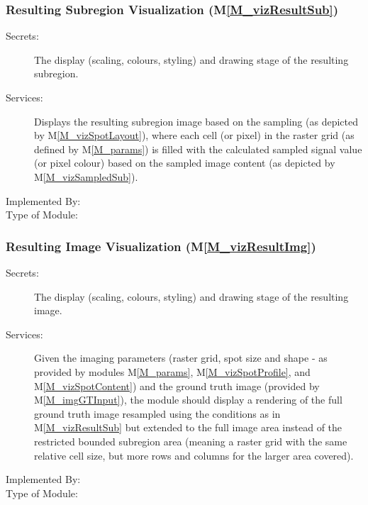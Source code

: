 \documentclass[12pt, titlepage]{article}
\newcommand{\mref}[1]{M\ref{#1}}
\begin{document}
\subsubsection{Resulting Subregion Visualization (\mref{M_vizResultSub})}
\begin{description}
\item[Secrets:]The display (scaling, colours, styling) and drawing stage 
  of the resulting subregion.
\item[Services:]Displays the resulting subregion image based on the sampling
  (as depicted by \mref{M_vizSpotLayout}),
  where each cell (or pixel) in the raster grid (as defined by \mref{M_params})
  is filled with the calculated sampled signal value (or pixel colour) based
  on the sampled image content (as depicted by \mref{M_vizSampledSub}).
\item[Implemented By:] \progname{}
\item[Type of Module:] 
\end{description}


\subsubsection{Resulting Image Visualization (\mref{M_vizResultImg})}
\begin{description}
\item[Secrets:]The display (scaling, colours, styling) and drawing stage 
  of the resulting image.
\item[Services:]Given the imaging parameters (raster grid, spot size and shape -
  as provided by modules \mref{M_params}, \mref{M_vizSpotProfile}, and \mref{M_vizSpotContent})
  and the ground truth image (provided by \mref{M_imgGTInput}),
  the module should display a rendering of the full ground truth image resampled
  using the conditions as in \mref{M_vizResultSub} but extended to the full image area
  instead of the restricted bounded subregion area (meaning a raster grid with the same
  relative cell size, but more rows and columns for the larger area covered).
\item[Implemented By:] \progname{}
\item[Type of Module:] 
\end{description}
\end{document}
